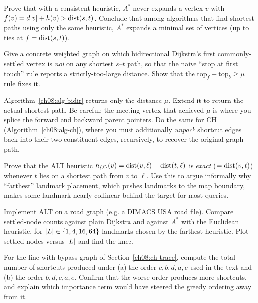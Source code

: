 \begin{exercise}[$A^*$ optimality]
\label{ch08:ex-astar-opt}
Prove that with a consistent heuristic, $A^*$ never expands a vertex $v$ with
$f(v)=d[v]+h(v) > \operatorname{dist}(s,t)$. Conclude that among algorithms that find shortest
paths using only the same heuristic, $A^*$ expands a minimal set of vertices (up
to ties at $f=\operatorname{dist}(s,t)$).
\end{exercise}

\begin{exercise}
\label{ch08:ex-first-touch}
Give a concrete weighted graph on which bidirectional Dijkstra's first
commonly-settled vertex is \emph{not} on any shortest $s$--$t$ path, so that the
naive ``stop at first touch'' rule reports a strictly-too-large distance. Show
that the $\mathrm{top}_f+\mathrm{top}_b\ge\mu$ rule fixes it.
\end{exercise}

\begin{exercise}
\label{ch08:ex-path}
Algorithm~\ref{ch08:alg-bidir} returns only the distance $\mu$. Extend it to
return the actual shortest path. Be careful: the meeting vertex that achieved
$\mu$ is where you splice the forward and backward parent pointers. Do the same
for CH (Algorithm~\ref{ch08:alg-ch}), where you must additionally
\emph{unpack} shortcut edges back into their two constituent edges, recursively,
to recover the original-graph path.
\end{exercise}

\begin{exercise}
\label{ch08:ex-landmark}
Prove that the ALT heuristic $h_{\{\ell\}}(v)=\operatorname{dist}(v,\ell)-\operatorname{dist}(t,\ell)$ is
\emph{exact} ($=\operatorname{dist}(v,t)$) whenever $t$ lies on a shortest path from $v$ to
$\ell$. Use this to argue informally why ``farthest'' landmark placement, which
pushes landmarks to the map boundary, makes some landmark nearly collinear-behind
the target for most queries.
\end{exercise}

\begin{exercise}
\label{ch08:ex-impl-alt}
Implement ALT on a road graph (e.g. a DIMACS USA road file). Compare settled-node
counts against plain Dijkstra and against $A^*$ with the Euclidean heuristic, for
$\lvert L\rvert\in\{1,4,16,64\}$ landmarks chosen by the farthest heuristic. Plot
settled nodes versus $\lvert L\rvert$ and find the knee.
\end{exercise}

\begin{exercise}
\label{ch08:ex-ch-count}
For the line-with-bypass graph of Section~\ref{ch08:ch-trace}, compute the total
number of shortcuts produced under (a) the order $c,b,d,a,e$ used in the text and
(b) the order $b,d,c,a,e$. Confirm that the worse order produces more shortcuts,
and explain which importance term would have steered the greedy ordering away
from it.
\end{exercise}

